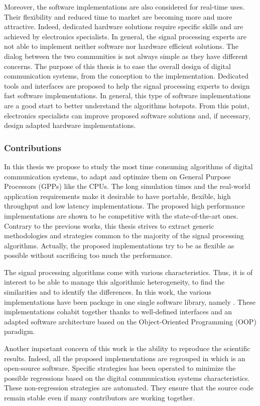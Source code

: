 Moreover, the software implementations are also considered for real-time uses.
Their flexibility and reduced time to market are becoming more and more
attractive. Indeed, dedicated hardware solutions require specific skills and are
achieved by electronics specialists. In general, the signal processing experts
are not able to implement neither software nor hardware efficient solutions. The
dialog between the two communities is not always simple as they have different
concerns. The purpose of this thesis is to ease the overall design of digital
communication systems, from the conception to the implementation. Dedicated
tools and interfaces are proposed to help the signal processing experts to
design fast software implementations. In general, this type of software
implementations are a good start to better understand the algorithms hotspots.
From this point, electronics specialists can improve proposed software solutions
and, if necessary, design adapted hardware implementations.

\subsubsection*{Contributions}

In this thesis we propose to study the most time consuming algorithms of digital
communication systems, to adapt and optimize them on General Purpose Processors
(GPPs) like the CPUs. The long simulation times and the real-world application
requirements make it desirable to have portable, flexible, high throughput and
low latency implementations. The proposed high performance implementations are
shown to be competitive with the state-of-the-art ones. Contrary to the previous
works, this thesis strives to extract generic methodologies and strategies
common to the majority of the signal processing algorithms. Actually, the
proposed implementations try to be as flexible as possible without sacrificing
too much the performance.

The signal processing algorithms come with various characteristics. Thus, it is
of interest to be able to manage this algorithmic heterogeneity, to find the
similarities and to identify the differences. In this work, the various
implementations have been package in one single software library, namely
\AFFECT. These implementations cohabit together thanks to well-defined
interfaces and an adapted software architecture based on the Object-Oriented
Programming (OOP) paradigm.

Another important concern of this work is the ability to reproduce the
scientific results. Indeed, all the proposed implementations are regrouped in
\AFFECT which is an open-source software. Specific strategies has been operated
to minimize the possible regressions based on the digital communication systems
characteristics. These non-regression strategies are automated. They ensure that
the source code remain stable even if many contributors are working together.

